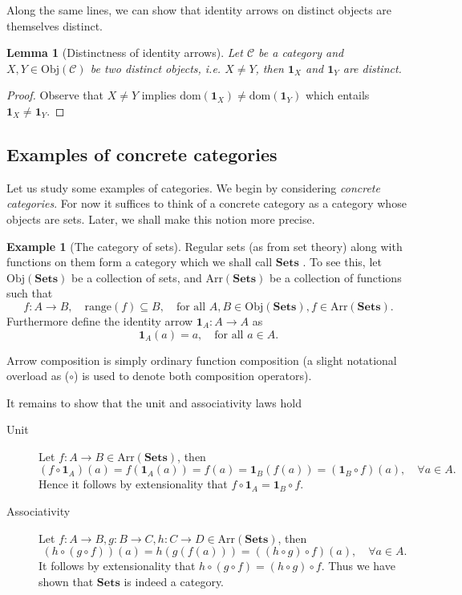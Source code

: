 \documentclass[10pt,twoside,a4paper]{article}
\newcounter{theorem}
\theoremstyle{plain}
\newtheorem{lemma}[thm]{Lemma}
\theoremstyle{definition}
\newtheorem{example}{Example}[section]
\newcommand{\domain}[1]{%
  \mathrm{dom}(#1)%
}
\newcommand{\range}[1]{%
  \mathrm{range}(#1)%
}
\newcommand{\id}[1]{%
  \ensuremath{\mathbf{1}_{#1}}%
}
\newcommand{\Obj}[1]{%
  \ensuremath{\mathrm{Obj}(#1)}%
}
\newcommand{\Arr}[1]{%
  \ensuremath{\mathrm{Arr}(#1)}%
}
\newcommand{\Sets}[0]{%
  \ensuremath{\mathbf{Sets}}%
}
\begin{document}
Along the same lines, we can show that identity arrows on distinct
objects are themselves distinct.
\begin{lemma}[Distinctness of identity arrows]
  Let $\mathcal{C}$ be a category and $X,Y \in \Obj{\mathcal{C}}$ be
  two distinct objects, i.e. $X \neq Y$, then $\id{X}$ and $\id{Y}$
  are distinct.
\end{lemma}
\begin{proof}
  Observe that $X \neq Y$ implies
  $\domain{\id{X}} \neq \domain{\id{Y}}$ which entails
  $\id{X} \neq \id{Y}$.
\end{proof}

\subsection{Examples of concrete categories}

Let us study some examples of categories. We begin by considering
\emph{concrete categories}. For now it suffices to think of a concrete
category as a category whose objects are sets. Later, we shall make
this notion more precise.

\begin{example}[The category of sets]
  Regular sets (as from set theory) along with functions on them form
  a category which we shall call \Sets{}. To see this, let
  $\Obj{\Sets}$ be a collection of sets, and $\Arr{\Sets}$ be a
  collection of functions such that
\[
  f : A \to B, \quad \range{f} \subseteq B, \quad \text{for all } A,B \in \Obj{\Sets}, f \in \Arr{\Sets}.
\]
Furthermore define the identity arrow $\id{A} : A \to A$ as
\[
   \id{A}(a) = a, \quad \text{for all } a \in A.
\]

Arrow composition is simply ordinary function composition (a slight
notational overload as ($\circ$) is used to denote both composition
operators).

It remains to show that the unit and associativity laws hold
\begin{description}
  \item[Unit] Let $f : A \to B \in \Arr{\Sets}$, then
\[
  (f \circ \id{A})(a) = f(\id{A}(a)) = f(a) = \id{B}(f(a)) = (\id{B} \circ f)(a), \quad \forall a \in A.
\]
Hence it follows by extensionality that
$f \circ \id{A} = \id{B} \circ f$.

\item[Associativity] Let $f : A \to B, g : B \to C, h : C \to D \in \Arr{\Sets}$, then
\[
  (h \circ (g \circ f))(a) = h(g(f(a))) = ((h \circ g) \circ f)(a), \quad \forall a \in A.
\]
It follows by extensionality that
$h \circ (g \circ f) = (h \circ g) \circ f$. Thus we have shown that
\Sets{} is indeed a category.
\end{description}
\end{example}
\end{document}
